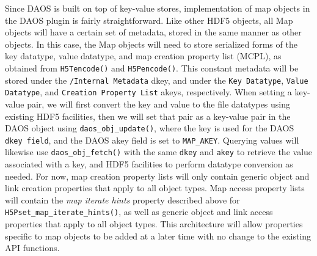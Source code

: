 Since DAOS is built on top of key-value stores, implementation of map objects in the DAOS plugin is fairly straightforward. Like other HDF5 objects, all Map objects will have a certain set of metadata, stored in the same manner as other objects. In this case, the Map objects will need to store serialized forms of the key datatype, value datatype, and map creation property list (MCPL), as obtained from \verb+H5Tencode()+ and \verb+H5Pencode()+. This constant metadata will be stored under the \verb+/Internal Metadata+ dkey, and under the \verb+Key Datatype+, \verb+Value Datatype+, and \verb+Creation Property List+ akeys, respectively.
When setting a key-value pair, we will first convert the key and value to the file datatypes using existing HDF5 facilities, then we will set that pair as a key-value pair in the DAOS object using \verb+daos_obj_update()+, where the key is used for the DAOS \verb+dkey field+, and the DAOS akey field is set to \verb+MAP_AKEY+. Querying values will likewise use \verb+daos_obj_fetch()+ with the same \verb+dkey+ and \verb+akey+ to retrieve the value associated with a key, and HDF5 facilities to perform datatype conversion as needed.
For now, map creation property lists will only contain generic object and link creation properties that apply to all object types. Map access property lists will contain the \textit{map iterate hints} property described above for \verb+H5Pset_map_iterate_hints()+, as well as generic object and link access properties that apply to all object types. This architecture will allow properties specific to map objects to be added at a later time with no change to the existing API functions.

